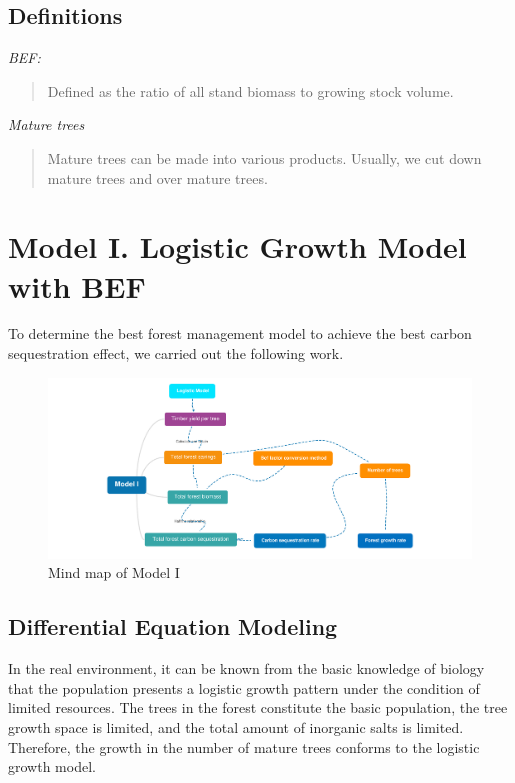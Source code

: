 \documentclass[12pt]{article}
\begin{document}
\subsection{Definitions}
\noindent\emph{BEF:}
\begin{quote}
    Defined as the ratio of all stand biomass to growing stock volume.\cite{Fang}
\end{quote}
\emph{Mature trees}
\begin{quote}
    Mature trees can be made into various products.
    Usually, we cut down mature trees and over mature trees.
\end{quote}

\section{Model I. Logistic Growth Model with BEF}
To determine the best forest management model to achieve the best carbon
sequestration effect, we carried out the following work.
\begin{figure}[htb]
    \centering
    \includegraphics[width=18cm]{Model I.pdf}
    \caption{Mind map of Model I}
\end{figure}
\subsection{Differential Equation Modeling}
In the real environment, it can be known from the basic knowledge of biology
that the population presents a logistic growth pattern under the condition of
limited resources. The trees in the forest constitute the basic population, the
tree growth space is limited, and the total amount of inorganic salts is
limited. Therefore, the growth in the number of mature trees conforms to the
logistic growth model\cite{F2,2009Ecology}.
\end{document}

